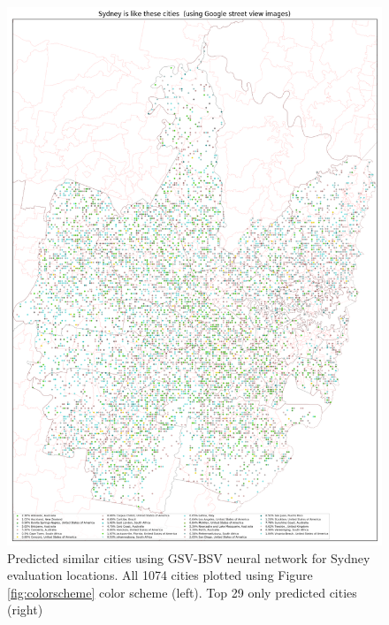 \documentclass[sageh,times]{sagej}
\begin{document}
\begin{figure}[!htbp]
\includegraphics[scale=0.20]{Images/SydneyOverallAbrev_street.png}  
\caption{Predicted similar cities using GSV-BSV neural network for Sydney evaluation locations. All 1074 cities plotted using Figure \ref{fig:colorscheme} color scheme (left). Top 29 only predicted cities (right)}    
 \label{fig:sydstreet}  
\end{figure} 


\end{document}
